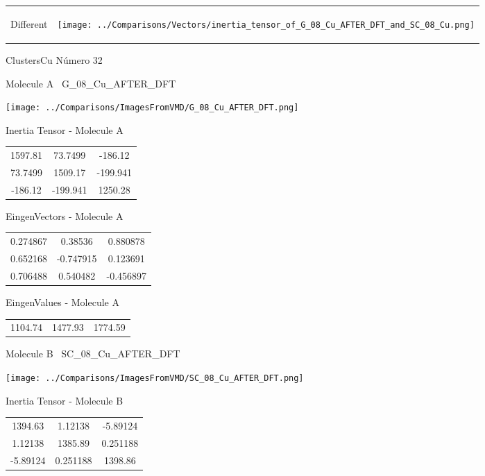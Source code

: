 \vtab[-5mm]
\begin{tabular}{*{2}{m{}}}
\begin{center}
\textcolor{NavyBlue}{\Large Different}
\end{center}
&
\begin{center}
\texttt{[image: ../Comparisons/Vectors/inertia\_tensor\_of\_G\_08\_Cu\_AFTER\_DFT\_and\_SC\_08\_Cu.png]}
\end{center}
\end{tabular}

 \newpage

\vtab[-3cm]
\begin{center}
{\large ClustersCu \tab Número 32}
\end{center}
\begin{multicols}{2}
\begin{center}

Molecule A \
G\_08\_Cu\_AFTER\_DFT

\texttt{[image: ../Comparisons/ImagesFromVMD/G\_08\_Cu\_AFTER\_DFT.png]}

Inertia Tensor - Molecule A \\
\begin{tabular}{|c c c|}
1597.81	 & 	73.7499	 & 	-186.12	 \\
73.7499	 & 	1509.17	 & 	-199.941	 \\
-186.12	 & 	-199.941	 & 	1250.28
\end{tabular}

\vtab
 EingenVectors - Molecule A     \\
\begin{tabular}{|c c c|}
0.274867	 & 	0.38536	 & 	0.880878	 \\
0.652168	 & 	-0.747915	 & 	0.123691	 \\
0.706488	 & 	0.540482	 & 	-0.456897
\end{tabular}

\vtab
 EingenValues - Molecule A     \\
\begin{tabular}{|c c c|}
1104.74	 & 	1477.93	 & 	1774.59	 \\
\end{tabular}
\columnbreak

Molecule B \
SC\_08\_Cu\_AFTER\_DFT

\texttt{[image: ../Comparisons/ImagesFromVMD/SC\_08\_Cu\_AFTER\_DFT.png]}

Inertia Tensor - Molecule B \\
\begin{tabular}{|c c c|}
1394.63	 & 	1.12138	 & 	-5.89124	 \\
1.12138	 & 	1385.89	 & 	0.251188	 \\
-5.89124	 & 	0.251188	 & 	1398.86
\end{tabular}


\end{center}
\end{multicols}
